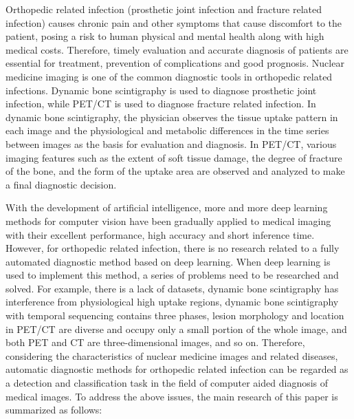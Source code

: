 \begin{eabstract}

    Orthopedic related infection (prosthetic joint infection and fracture related infection) causes chronic pain and other symptoms that cause discomfort to the patient, posing a risk to human physical and mental health along with high medical costs. Therefore, timely evaluation and accurate diagnosis of patients are essential for treatment, prevention of complications and good prognosis. Nuclear medicine imaging is one of the common diagnostic tools in orthopedic related infections. Dynamic bone scintigraphy is used to diagnose prosthetic joint infection, while PET/CT is used to diagnose fracture related infection. In dynamic bone scintigraphy, the physician observes the tissue uptake pattern in each image and the physiological and metabolic differences in the time series between images as the basis for evaluation and diagnosis. In PET/CT, various imaging features such as the extent of soft tissue damage, the degree of fracture of the bone, and the form of the uptake area are observed and analyzed to make a final diagnostic decision.

    With the development of artificial intelligence, more and more deep learning methods for computer vision have been gradually applied to medical imaging with their excellent performance, high accuracy and short inference time. However, for orthopedic related infection, there is no research related to a fully automated diagnostic method based on deep learning. When deep learning is used to implement this method, a series of problems need to be researched and solved. For example, there is a lack of datasets, dynamic bone scintigraphy has interference from physiological high uptake regions, dynamic bone scintigraphy with temporal sequencing contains three phases, lesion morphology and location in PET/CT are diverse and occupy only a small portion of the whole image, and both PET and CT are three-dimensional images, and so on. Therefore, considering the characteristics of nuclear medicine images and related diseases, automatic diagnostic methods for orthopedic related infection can be regarded as a detection and classification task in the field of computer aided diagnosis of medical images. To address the above issues, the main research of this paper is summarized as follows:


\end{eabstract}
